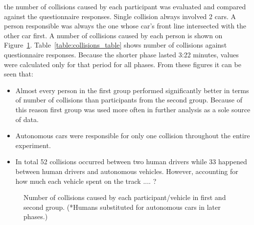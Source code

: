 \documentclass[11pt,english,twoside]{article}
\begin{document}
the number of collisions caused by each participant was evaluated and compared against the questionnaire responses. Single collision always involved 2 cars. A person responsible was always the one whose car's front line intersected with the other car first. A number of collisions caused by each person is shown on Figure~\ref{fig:collisions_total}. Table~\ref{table:collisions_table} shows number of collisions against questionnaire responses. Because the shorter phase lasted 3:22 minutes, values were calculated only for that period for all phases. From these figures it can be seen that:
\begin{itemize}
  \item Almost every person in the first group performed significantly better in terms of number of collisions than participants from the second group. Because of this reason first group was used more often in further analysis as a sole source of data.
  \item Autonomous cars were responsible for only one collision throughout the entire experiment. 
  \item  In total 52 collisions occurred between two human drivers while 33 happened between human drivers and autonomous vehicles. However, accounting for how much each vehicle spent on the track .... ?
\end{itemize}











\begin{figure}[!] %
\caption{Number of collisions caused by each participant/vehicle in first and second group. (*Humans substituted for autonomous cars in later phases.)}
\label{fig:collisions_total}
\end{figure}
\end{document}
